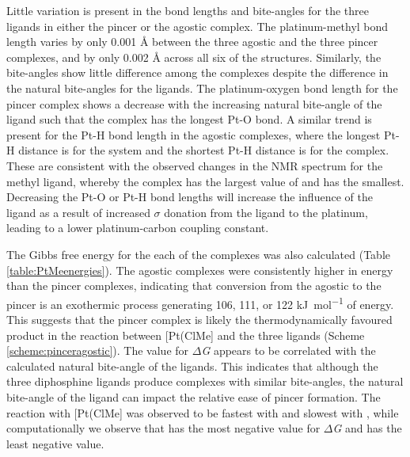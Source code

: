 Little variation is present in the bond lengths and bite-angles for the three ligands in either the pincer or the agostic complex.  The platinum-methyl bond length varies by only 0.001 \si{\angstrom} between the three agostic and the three pincer complexes, and by only 0.002 \si{\angstrom} across all six of the structures.  Similarly, the bite-angles show little difference among the complexes despite the difference in the natural bite-angles for the ligands.  The platinum-oxygen bond length for the pincer complex shows a decrease with the increasing natural bite-angle of the ligand such that the \tBusixantphos{} complex has the longest Pt-O bond.  A similar trend is present for the Pt-H bond length in the agostic complexes, where the longest Pt-H distance is for the \tBusixantphos{} system and the shortest Pt-H distance is for the \tBuxantphos{} complex.  These are consistent with the observed changes in the \carbon{} NMR spectrum for the methyl ligand, whereby the \tBusixantphos{} complex has the largest value of \JPtC{} and \tBuxantphos{} has the smallest.  Decreasing the Pt-O or Pt-H bond lengths will increase the \trans{} influence of the ligand as a result of increased $\sigma$ donation from the ligand to the platinum, leading to a lower platinum-carbon coupling constant.  

The Gibbs free energy for the each of the complexes was also calculated (Table \ref{table:PtMeenergies}).  The agostic complexes were consistently higher in energy than the pincer complexes, indicating that conversion from the agostic to the pincer is an exothermic process generating 106, 111, or 122 \si{\kilo\joule\per\mole} of energy.  This suggests that the pincer complex is likely the thermodynamically favoured product in the reaction between [Pt(ClMe] and the three \tBuxantphos{} ligands (Scheme \ref{scheme:pinceragostic}).  The value for $\Delta$\emph{G} appears to be correlated with the calculated natural bite-angle of the ligands.  This indicates that although the three diphosphine ligands produce complexes with similar bite-angles, the natural bite-angle of the ligand can impact the relative ease of pincer formation.  The reaction with [Pt(ClMe] was observed to be fastest with \tBuxantphos{} and slowest with \tBusixantphos{}, while computationally we observe that \tBuxantphos{} has the most negative value for $\Delta$\emph{G} and \tBusixantphos{} has the least negative value.  

